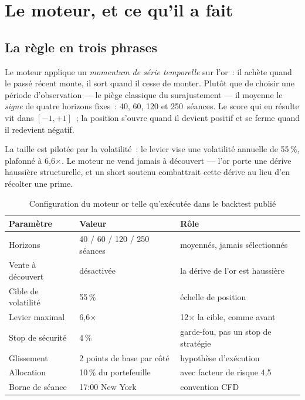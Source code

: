 \section{Le moteur, et ce qu'il a fait}

\subsection{La règle en trois phrases}

Le moteur applique un \emph{momentum de série temporelle} sur l'or~: il achète
quand le passé récent monte, il sort quand il cesse de monter. Plutôt que de
choisir une période d'observation --- le piège classique du surajustement ---
il moyenne le \emph{signe} de quatre horizons fixes~: 40, 60, 120 et
250~séances. Le score qui en résulte vit dans $[-1, +1]$~; la position s'ouvre
quand il devient positif et se ferme quand il redevient négatif.

La taille est pilotée par la volatilité~: le levier vise une volatilité annuelle
de 55\,\%, plafonné à 6,6$\times$. Le moteur ne vend jamais à découvert --- l'or
porte une dérive haussière structurelle, et un short soutenu combattrait cette
dérive au lieu d'en récolter une prime.

\begin{table}[H]
\centering
\begin{tabular}{@{}lll@{}}
\toprule
Paramètre & Valeur & Rôle \\
\midrule
Horizons          & 40 / 60 / 120 / 250 séances & moyennés, jamais sélectionnés \\
Vente à découvert & désactivée                   & la dérive de l'or est haussière \\
Cible de volatilité & 55\,\%                     & échelle de position \\
Levier maximal    & 6,6$\times$                  & 12$\times$ la cible, comme avant \\
Stop de sécurité  & 4\,\%                        & garde-fou, pas un stop de stratégie \\
Glissement        & 2 points de base par côté    & hypothèse d'exécution \\
Allocation        & 10\,\% du portefeuille       & avec facteur de risque 4,5 \\
Borne de séance   & 17{:}00 New York             & convention CFD \\
\bottomrule
\end{tabular}
\caption{Configuration du moteur or telle qu'exécutée dans le backtest publié}
\end{table}

